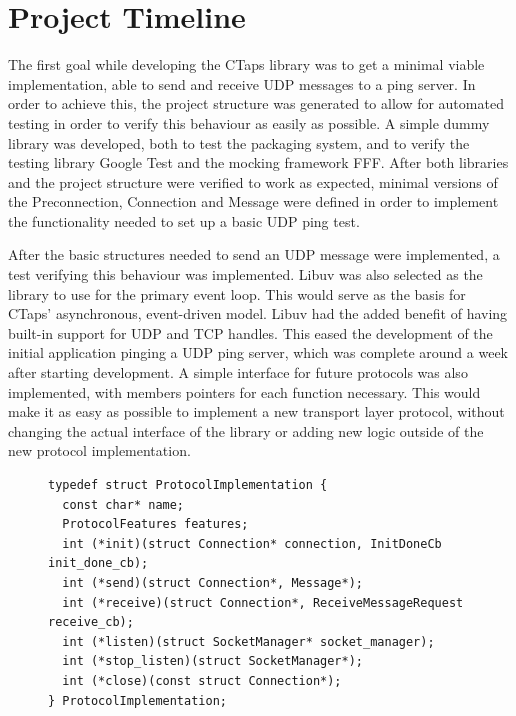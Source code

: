 

\chapter{Project Timeline} \label{projectTimeline}
The first goal while developing the CTaps library was to get a minimal viable implementation,
able to send and receive UDP messages to a ping server. In order to
achieve this, the project structure was generated to allow for automated
testing in order to verify this behaviour as easily as possible.
A simple dummy library was developed, both to test the packaging system,
and to verify the testing library Google Test and the mocking framework FFF.
After both libraries and the project structure were verified to work
as expected, minimal versions of the Preconnection, Connection and Message
were defined in order to implement the functionality needed to set up a
basic UDP ping test.

After the basic structures needed to send an UDP message were implemented,
a test verifying this behaviour was implemented. Libuv was also selected
as the library to use for the primary event loop. This would serve as the
basis for CTaps' asynchronous, event-driven model. Libuv had the added benefit
of having built-in support for UDP and TCP handles. This eased the development
of the initial application pinging a UDP ping server, which was complete around
a week after starting development. A simple interface for future protocols was
also implemented, with members  pointers for each function necessary. This would
make it as easy as possible to implement a new transport layer protocol, without
changing the actual interface of the library or adding new logic outside of the
new protocol implementation.

\begin{figure}[H]
\begin{verbatim}
typedef struct ProtocolImplementation {
  const char* name;
  ProtocolFeatures features;
  int (*init)(struct Connection* connection, InitDoneCb init_done_cb);
  int (*send)(struct Connection*, Message*);
  int (*receive)(struct Connection*, ReceiveMessageRequest receive_cb);
  int (*listen)(struct SocketManager* socket_manager);
  int (*stop_listen)(struct SocketManager*);
  int (*close)(const struct Connection*);
} ProtocolImplementation;
\end{verbatim}
\label{The interface used to interact with protocols}
\end{figure}

